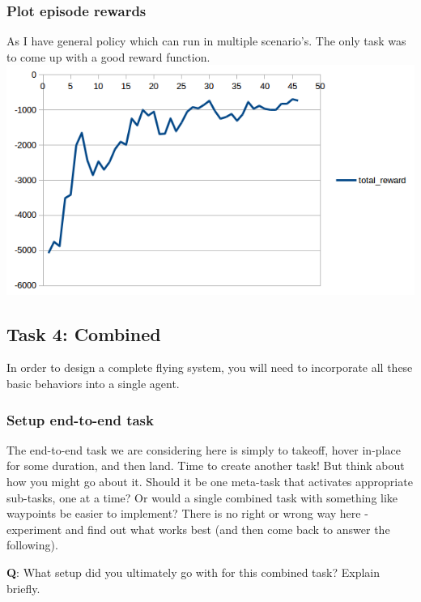 \documentclass[11pt]{article}
\makeatletter
\def\maxwidth{\ifdim\Gin@nat@width>\linewidth\linewidth
    \else\Gin@nat@width\fi}
\let\Oldincludegraphics\includegraphics
\renewcommand{\includegraphics}[1]{\Oldincludegraphics[width=.8\maxwidth]{#1}}
\makeatother
\begin{document}
\hypertarget{plot-episode-rewards}{%
\subsubsection{Plot episode rewards}\label{plot-episode-rewards}}

As I have general policy which can run in multiple scenario's. The only
task was to come up with a good reward function.
\includegraphics{images/landing.png}

    \hypertarget{task-4-combined}{%
\subsection{Task 4: Combined}\label{task-4-combined}}

In order to design a complete flying system, you will need to
incorporate all these basic behaviors into a single agent.

\hypertarget{setup-end-to-end-task}{%
\subsubsection{Setup end-to-end task}\label{setup-end-to-end-task}}

The end-to-end task we are considering here is simply to takeoff, hover
in-place for some duration, and then land. Time to create another task!
But think about how you might go about it. Should it be one meta-task
that activates appropriate sub-tasks, one at a time? Or would a single
combined task with something like waypoints be easier to implement?
There is no right or wrong way here - experiment and find out what works
best (and then come back to answer the following).

\textbf{Q}: What setup did you ultimately go with for this combined
task? Explain briefly.
\end{document}

